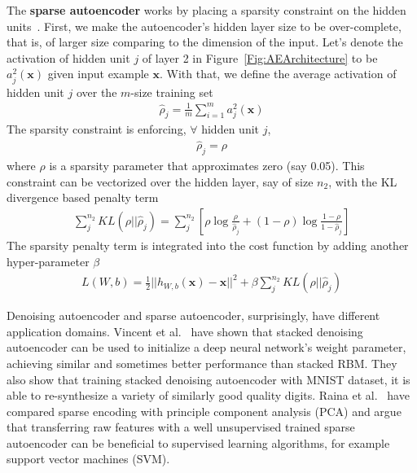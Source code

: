 The \textbf{sparse autoencoder} works by placing a sparsity constraint on the hidden units~\cite{SparseAE}.
First, we make the autoencoder's hidden layer size to be over-complete,
that is, of larger size comparing to the dimension of the input.
Let's denote the activation of hidden unit $j$ of layer 2 in Figure~\ref{Fig:AEArchitecture}
to be $a^2_j(\mathbf{x})$ given input example $\mathbf{x}$.
With that, we define the average activation of hidden unit $j$ over the $m$-size
training set
\begin{align}
    \hat{\rho}_j = \frac{1}{m} \sum_{i=1}^{m} a^2_j(\mathbf{x})
\end{align}
The sparsity constraint is enforcing, $\forall$ hidden unit $j$,
\begin{align}
    \hat{\rho}_j = \rho
\end{align}
where $\rho$ is a sparsity parameter that approximates zero (say 0.05).
This constraint can be vectorized over the hidden layer, say of size $n_2$,
with the KL divergence based penalty term
\begin{align}
    \sum_j^{n_2} KL(\rho || \hat{\rho}_j)
    = \sum_j^{n_2} [\rho \log \frac{\rho}{\hat{\rho}_j} + (1 - \rho) \log \frac{1-\rho}{1-\hat{\rho}_j} ]
\end{align}
The sparsity penalty term is integrated into the cost function by adding another hyper-parameter $\beta$
\begin{align}
    L(W, b) = \frac{1}{2}||h_{W,b}(\mathbf{x}) - \mathbf{x}||^2 +
    \beta \sum_j^{n_2} KL(\rho || \hat{\rho}_j)
\end{align}

Denoising autoencoder and sparse autoencoder, surprisingly, have different application domains.
Vincent et al.~\cite{DenoiseAE} have shown that stacked denoising autoencoder can be used to
initialize a deep neural network's weight parameter,
achieving similar and sometimes better performance than stacked RBM.
They also show that training stacked denoising autoencoder with MNIST dataset, it is able
to re-synthesize a variety of similarly good quality digits.
Raina et al.~\cite{SparseAE} have compared sparse encoding with principle component analysis
(PCA) and argue that transferring raw features with a well unsupervised trained
sparse autoencoder can be beneficial to supervised learning algorithms,
for example support vector machines (SVM).
